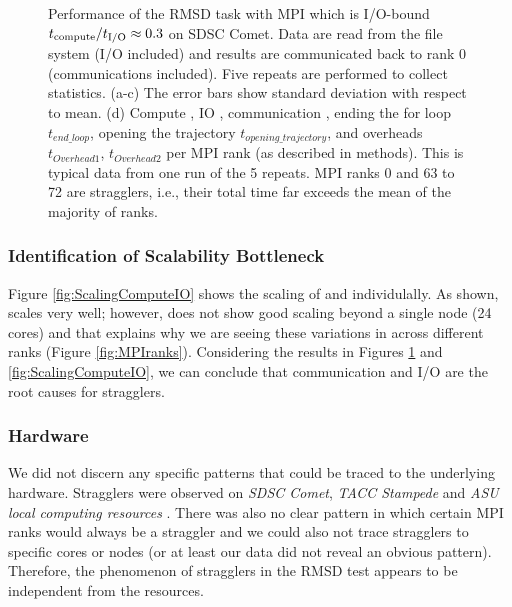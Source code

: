 \begin{figure}[ht!]
\caption{Performance of the RMSD task with MPI which is I/O-bound ${t}_{\text{compute}}/{t}_{\text{I/O}} \approx 0.3$ on SDSC Comet.
Data are read from the file system (I/O included) and results are communicated back to
rank 0 (communications included). Five repeats are performed to collect statistics. (a-c) The error bars show
standard deviation with respect to mean. (d) Compute \tcomp, IO \tIO, communication \tcomm, ending the for loop $t_{end\_loop}$,
  opening the trajectory $t_{opening\_trajectory}$, and overheads $t_{Overhead1}$,  $t_{Overhead2}$ per MPI rank (as described in methods).
  This is typical data from one run of the 5 repeats. MPI ranks 0 and 63 to 72 are stragglers, i.e., their total time 
far exceeds the mean of the majority of ranks.}
  
\label{fig:MPIwithIO}
\end{figure} 

\subsubsection*{Identification of Scalability Bottleneck}

Figure \ref{fig:ScalingComputeIO} shows the scaling of \tcomp and \tIO individulally. 
As shown, \tcomp scales very well; however, \tIO does not show good scaling beyond a single node (24 cores) and that explains why we are seeing these variations in \tIO across different ranks (Figure \ref{fig:MPIranks}). 
Considering the results in Figures \ref{fig:MPIwithIO} and \ref{fig:ScalingComputeIO}, we can conclude that communication and I/O are the root causes for stragglers. 

\subsubsection*{Hardware}
 
We did not discern any specific patterns that could be traced to the underlying hardware. Stragglers were observed on \emph{SDSC Comet},
\emph{TACC Stampede} and \emph{ASU local computing resources} \cite{Khoshlessan:2017ab}. There was also no clear pattern in which certain MPI
ranks would always be a straggler and we could also not trace stragglers to specific cores or nodes (or at least our data did not
reveal an obvious pattern). Therefore, the phenomenon of stragglers in the RMSD test appears to be independent from the resources.

